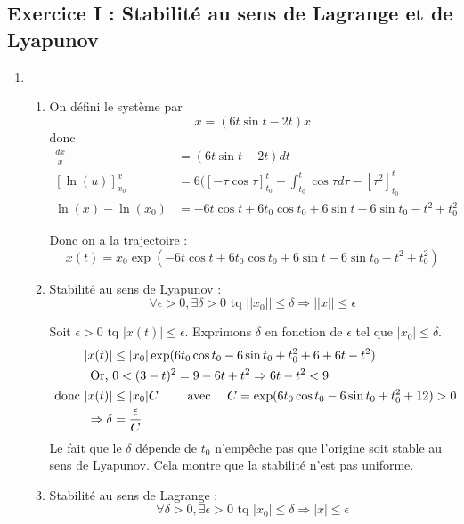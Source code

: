 \documentclass{../../td}{subfiles}
\begin{document}
\subsection*{Exercice I : Stabilité au sens de Lagrange et de Lyapunov}

\begin{enumerate}\setlength{\itemsep}{1cm}

\item \begin{enumerate}\renewcommand{\theenumi}{\alph{enumi}}\setlength{\itemsep}{8mm}

\item On défini le système par \[\dot{x}=(6t\sin t - 2t)x\] donc 
\begin{align*}
\frac{dx}{x} & = (6t \sin t - 2t) dt \\
[\ln(u)]_{x_0}^x & = 6( [-\tau \cos \tau ]_{t_0}^t + \int_{t_0}^t \cos \tau d \tau - [\tau^2]_{t_0}^t \\
\ln(x) - \ln(x_0) & = -6t\cos t + 6t_0\cos t_0 + 6\sin t - 6\sin t_0 - t^2 + t_0^2 
\end{align*}

Donc on a la trajectoire :
\[ x(t) = x_0 \exp(-6t\cos t + 6t_0\cos t_0 + 6\sin t - 6\sin t_0 - t^2 + t_0^2) \]

\item Stabilité au sens de Lyapunov :
\[ \forall \epsilon > 0, \exists \delta >0 \text{ tq } ||x_0|| \leq \delta \Rightarrow ||x|| \leq \epsilon \]

Soit $\epsilon>0 \text{ tq } |x(t)| \leq \epsilon$. Exprimons $\delta$ en fonction de $\epsilon$ tel que $|x_0| \leq \delta$.
\begin{align*}
|x(t)| & \leq |x_0| \exp (6t_0 \cos t_0 - 6\sin t_0 + t_0^2 + 6 + 6 t - t^2) \\
\text{Or, } & 0 < (3-t)^2 = 9-6t+t^2 \Rightarrow 6t-t^2 < 9 \\
\text{ donc } |x(t)| & \leq |x_0| C \quad \quad\text{ avec }\quad C = \exp(6t_0 \cos t_0 - 6\sin t_0 + t_0^2 + 12) > 0 \\
\Rightarrow \delta & = \frac{\epsilon}{C}
\end{align*}
Le fait que le $\delta$ dépende de $t_0$ n'empêche pas que l'origine soit stable au sens de Lyapunov. Cela montre que la stabilité n'est pas uniforme.

\item Stabilité au sens de Lagrange :
\[ \forall \delta > 0, \exists \epsilon >0 \text{ tq } |x_0| \leq \delta \Rightarrow |x| \leq \epsilon \]


\end{enumerate}
\end{enumerate}
\end{document}
